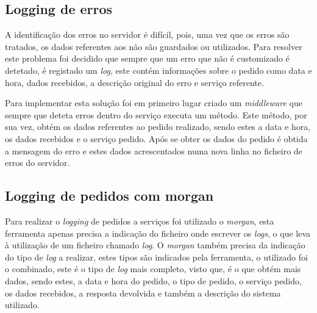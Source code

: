 \subsection{Logging de erros}

A identificação dos erros no servidor é difícil, pois, uma vez que os erros são tratados, os dados referentes aos não são guardados ou utilizados. Para resolver este problema foi decidido que sempre que um erro que não é customizado é detetado, é registado um \textit{log}, este contém informações sobre o pedido como data e hora, dados recebidos, a descrição original do erro e serviço referente.

Para implementar esta solução foi em primeiro lugar criado um \textit{middleware} que sempre que deteta erros dentro do serviço executa um método. Este método, por sua vez, obtém os dados referentes ao pedido realizado, sendo estes a data e hora, os dados recebidos e o serviço pedido. Após se obter os dados do pedido é obtida a mensagem do erro e estes dados acrescentados numa nova linha no ficheiro de erros do servidor.

\subsection{Logging de pedidos com morgan}

Para realizar o \textit{logging} de pedidos a serviços foi utilizado o \textit{morgan}, esta ferramenta apenas precisa a indicação do ficheiro onde escrever os \textit{logs}, o que leva à utilização de um ficheiro chamado \textit{log}. O \textit{morgan} também precisa da indicação do tipo de \textit{log} a realizar, estes tipos são indicados pela ferramenta, o utilizado foi o combinado, este é o tipo de \textit{log} mais completo, visto que, é o que obtém mais dados, sendo estes, a data e hora do pedido, o tipo de pedido, o serviço pedido, os dados recebidos, a resposta devolvida e também a descrição do sistema utilizado.